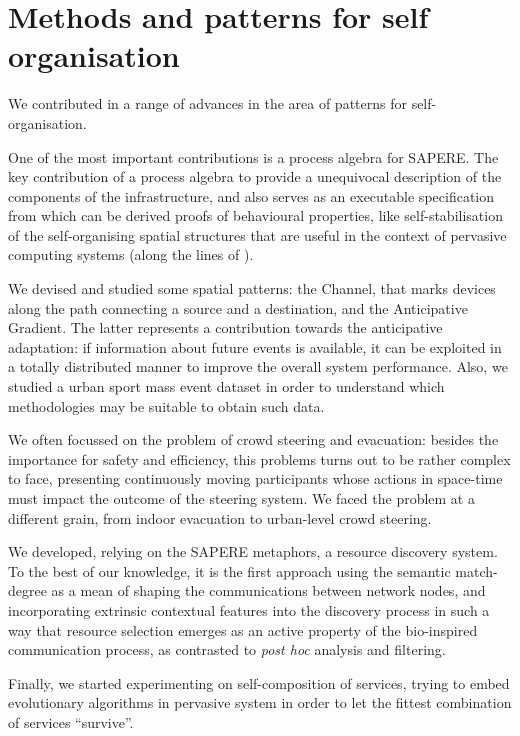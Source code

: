 \documentclass[12pt,a4paper,twoside,openright]{book}
\begin{document}
\section{Methods and patterns for self organisation}

We contributed in a range of advances in the area of patterns for self-organisation.

One of the most important contributions is a process algebra for SAPERE. The key contribution of a process algebra to provide a unequivocal description of the components of the infrastructure, and also serves as an executable specification from which can be derived proofs of behavioural properties, like self-stabilisation of the self-organising spatial structures that are useful in the context of pervasive computing systems (along the lines of \cite{V-SCW2013}).

We devised and studied some spatial patterns: the Channel, that marks devices along the path connecting a source and a destination, and the Anticipative Gradient.
%
The latter represents a contribution towards the anticipative adaptation: if information about future events is available, it can be exploited in a totally distributed manner to improve the overall system performance.
%
Also, we studied a urban sport mass event dataset in order to understand which methodologies may be suitable to obtain such data.

We often focussed on the problem of crowd steering and evacuation: besides the importance for safety and efficiency, this problems turns out to be rather complex to face, presenting continuously moving participants whose actions in space-time must impact the outcome of the steering system.
%
We faced the problem at a different grain, from indoor evacuation to urban-level crowd steering.

We developed, relying on the SAPERE metaphors, a resource discovery system.
%
To the best of our knowledge, it is the first approach using the semantic match-degree as a mean of shaping the communications between network nodes, and incorporating extrinsic contextual features into the discovery process in such a way that resource selection emerges as an active property of the bio-inspired communication process, as contrasted to \emph{post hoc} analysis and filtering.

Finally, we started experimenting on self-composition of services, trying to embed evolutionary algorithms in pervasive system in order to let the fittest combination of services ``survive''.
\end{document}
